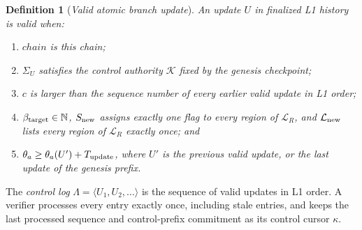 \documentclass[11pt,a4paper]{article}
\newcommand{\defterm}[1]{\textcolor{rrBlue}{\textit{#1}}}
\newtheorem{definition}{Definition}[section]
\begin{document}
\begin{definition}[\defterm{Valid atomic branch update}]
\label{def:control-valid}
An update $U$ in finalized L1 history is valid when:
\begin{enumerate}[label=(V\arabic*)]
\item $\mathit{chain}$ is this chain;
\item $\Sigma_U$ satisfies the control authority $\mathcal K$ fixed by
the genesis checkpoint;
\item $c$ is larger than the sequence number of every earlier valid
update in L1 order;
\item $\beta_{\rm target}\in\mathbb N$, $S_{\rm new}$ assigns exactly
one flag to every region of $\mathcal L_R$, and $\mathcal L_{\rm new}$
lists every region of $\mathcal L_R$ exactly once; and
\item $\theta_a\ge\theta_a(U')+T_{\rm update}$, where $U'$ is the
previous valid update, or the last update of the genesis prefix.
\end{enumerate}
\end{definition}

The \defterm{control log} $\Lambda=\langle U_1,U_2,\ldots\rangle$ is the
sequence of valid updates in L1 order. A verifier processes every entry
exactly once, including stale entries, and keeps the last processed
sequence and control-prefix commitment as its control cursor $\kappa$.
\end{document}
